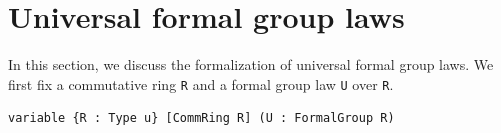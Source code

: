 






\section{Universal formal group laws}

In this section, we discuss the formalization of universal formal group
laws.  We first fix a commutative ring \lstinline|R| and a formal group
law \lstinline|U| over \lstinline|R|.

\begin{lstlisting}
variable {R : Type u} [CommRing R] (U : FormalGroup R)
\end{lstlisting}

